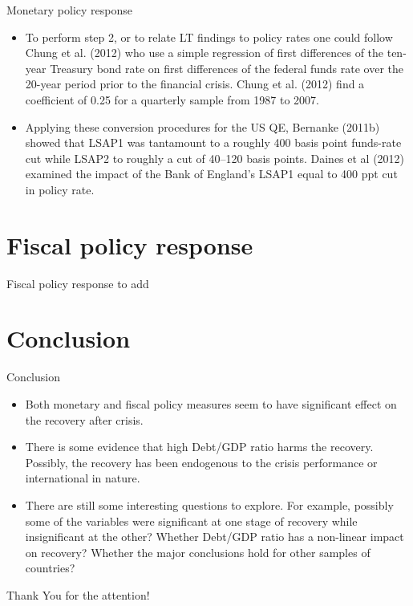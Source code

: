 \documentclass[xcolor=dvipsnames]{beamer}
\begin{document}
\begin{frame}{Monetary policy response} 
\begin{itemize}
\item To perform step 2, or to relate LT findings to policy rates one could follow Chung et al. (2012) who use a simple regression of first differences of the ten-year Treasury bond rate on first differences of the federal funds rate over the 20-year period prior to the financial crisis. Chung et al. (2012) find a coefficient of 0.25 for a quarterly sample from 1987 to 2007.
\item Applying these conversion procedures for the US QE, Bernanke (2011b) showed that LSAP1 was tantamount to a roughly 400 basis point funds-rate cut while LSAP2 to roughly a cut of 40–120 basis points. Daines et al (2012) examined the impact of the Bank of England’s LSAP1 equal to 400 ppt cut in policy rate.
\end{itemize}
\end{frame}

\section{Fiscal policy response}
\begin{frame}{Fiscal policy response} 
to add
\end{frame}
\section{Conclusion}
\begin{frame}{Conclusion} 
\setlength{\leftmargini}{0pt}\
\begin{itemize}
\item Both monetary and fiscal policy measures seem to have significant effect on the recovery after crisis.
\item There is some evidence that high Debt/GDP ratio harms the recovery. Possibly, the recovery has been endogenous to the crisis performance or international in nature.
\item There are still some interesting questions to explore. For example, possibly some of the variables were significant at one stage of recovery while insignificant at the other? Whether Debt/GDP ratio has a non-linear impact on recovery? Whether the major conclusions hold for other samples of countries?
\end{itemize}
\end{frame}
\begin{frame}%
\begin{center}
\Huge Thank You for the attention!
\end{center}
\end{frame}
\end{document}
